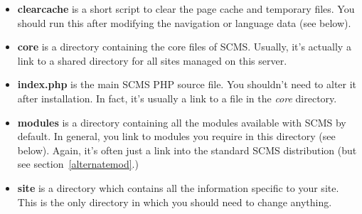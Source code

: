 \begin{itemize}
 \item \textbf{clearcache} is a short script to clear the page cache and temporary files.
You should run this after modifying the navigation or language data (see below).
\item \textbf{core} is a directory containing the core files of SCMS. Usually, it's actually a link to a shared directory
for all sites managed on this server.
\item \textbf{index.php} is the main SCMS PHP source file. You shouldn't need to alter it after
installation. In fact, it's usually a link to a file in the \emph{core} directory.
\item \textbf{modules} is a directory containing all the modules available with SCMS by default.
In general, you link to modules you require in this directory (see below). Again, it's often just a link
into the standard SCMS distribution (but see section~\ref{alternatemod}.)
\item \textbf{site} is a directory which contains all the information specific to your site.
This is the only directory in which you should need to change anything.
\end{itemize}

\clearpage
